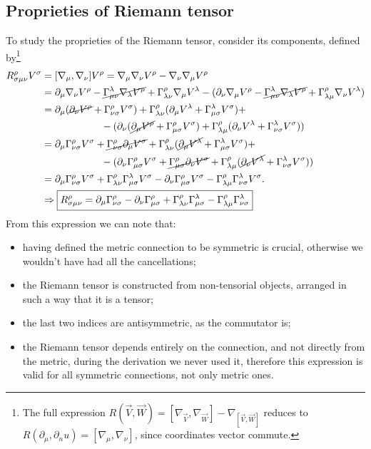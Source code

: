 \subsection{Proprieties of Riemann tensor}
To study the proprieties of the Riemann tensor, consider its components, defined by\footnote{The full expression $R(\vec V,\vec W)=[\nabla_{\vec V},\nabla_{\vec W}]-\nabla_{[\vec V,\vec W]}$ reduces to $R(\partial_\mu,\partial_nu)=[\nabla_\mu,\nabla_\nu]$, since coordinates vector commute.}
\begin{align*}
    R^\rho_{\sigma\mu\nu}V^\sigma&=[\nabla_\mu,\nabla_\nu]V^\rho=\nabla_\mu\nabla_\nu V^\rho-\nabla_\nu\nabla_\mu V^\rho\\
    &=\partial_\mu \nabla_\nu V^\rho-\cancel{\Gamma_{\mu\nu}^\lambda\nabla_\lambda V^\rho}+\Gamma_{\lambda\nu}^\rho\nabla_\mu V^\lambda-(\partial_\nu \nabla_\mu V^\rho-\cancel{\Gamma_{\mu\nu}^\lambda\nabla_\lambda V^\rho}+\Gamma_{\lambda\mu}^\rho\nabla_\nu V^\lambda)\\
    &=\partial_\mu (\cancel{\partial_\nu V^\rho}+\Gamma^\rho_{\nu\sigma}V^\sigma)+\Gamma_{\lambda\nu}^\rho(\partial_\mu V^\lambda+\Gamma^\lambda_{\mu\sigma}V^\sigma)+\\&\qquad\qquad\qquad-(\partial_\nu (\cancel{\partial_\mu V^\rho}+\Gamma^\rho_{\mu\sigma}V^\sigma)+\Gamma_{\lambda\mu}^\rho(\partial_\nu V^\lambda+\Gamma^\lambda_{\nu\sigma}V^\sigma))\\
    &=\partial_\mu \Gamma^\rho_{\nu\sigma}V^\sigma+ \cancel{\Gamma^\rho_{\nu\sigma}\partial_\mu V^\sigma}+\Gamma_{\lambda\nu}^\rho(\cancel{\partial_\mu V^\lambda}+\Gamma^\lambda_{\mu\sigma}V^\sigma)+\\&\qquad\qquad\qquad-(\partial_\nu \Gamma^\rho_{\mu\sigma}V^\sigma+ \cancel{\Gamma^\rho_{\mu\sigma}\partial_\nu V^\sigma}+\Gamma_{\lambda\mu}^\rho(\cancel{\partial_\nu V^\lambda}+\Gamma^\lambda_{\nu\sigma}V^\sigma))\\&=\partial_\mu \Gamma^\rho_{\nu\sigma}V^\sigma +\Gamma_{\lambda\nu}^\rho\Gamma^\lambda_{\mu\sigma}V^\sigma-\partial_\nu \Gamma^\rho_{\mu\sigma}V^\sigma-\Gamma_{\lambda\mu}^\rho\Gamma^\lambda_{\nu\sigma}V^\sigma.\\
    &\Rightarrow\boxed{R^\rho_{\sigma\mu\nu}=\partial_\mu \Gamma^\rho_{\nu\sigma} -\partial_\nu \Gamma^\rho_{\mu\sigma}+\Gamma_{\lambda\nu}^\rho\Gamma^\lambda_{\mu\sigma}-\Gamma_{\lambda\mu}^\rho\Gamma^\lambda_{\nu\sigma}}
\end{align*} 
\newpage
From this expression we can note that:
\begin{itemize}
    \item having defined the metric connection to be symmetric is crucial, otherwise we wouldn't have had all the cancellations;
    \item the Riemann tensor is constructed from non-tensorial objects, arranged in such a way that it is a tensor;
    \item the last two indices are antisymmetric, as the commutator is;
    \item the Riemann tensor depends entirely on the connection, and not directly from the metric, during the derivation we never used it, therefore this expression is valid for all symmetric connections, not only metric ones.
\end{itemize}
